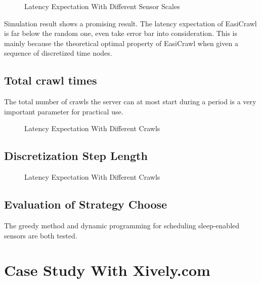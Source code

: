 \documentclass[conference]{IEEEtran}
\begin{document}
\begin{figure}
	\centering
	
	\captionsetup{justification=centering}
	\caption{Latency Expectation With Different Sensor Scales}
	\label{fig:test1_sensorscale}
\end{figure}

Simulation result shows a promising result. The latency expectation of EasiCrawl is far below the random one, even take error bar into consideration. This is mainly because the theoretical optimal property of EasiCrawl when given a sequence of discretized time nodes. 

\subsection{Total crawl times}

The total number of crawls the server can at most start during a period is a very important parameter for practical use. 

\begin{figure}
	\centering
	
	\captionsetup{justification=centering}
	\caption{Latency Expectation With Different Crawls}
	\label{fig:test2_totalcrawl}
\end{figure}

\subsection{Discretization Step Length}

\begin{figure}
	\centering
	
	\captionsetup{justification=centering}
	\caption{Latency Expectation With Different Crawls}
	\label{fig:test3_discretestep}
\end{figure}

\subsection{Evaluation of Strategy Choose}

The greedy method and dynamic programming for scheduling sleep-enabled sensors are both tested.

\section{Case Study With Xively.com}
\end{document}
